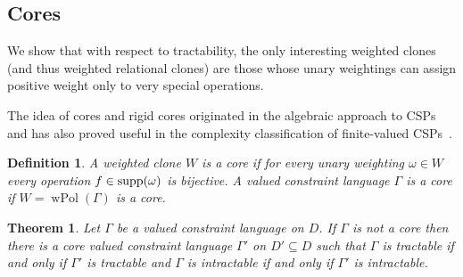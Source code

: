 \documentclass[11pt, reqno]{article}
\DeclareMathOperator{\wpol}{wPol}
\DeclareMathOperator{\supp}{{\rm supp}}
\newtheorem{theorem}{Theorem}%
\newtheorem{definition}{Definition}
\theoremstyle{remark}
\begin{document}
\subsection{Cores}

We show that with respect to tractability, the only
interesting weighted clones (and thus weighted relational clones) are those
whose unary weightings can assign positive weight only to very special
operations.

The idea of cores and rigid cores originated in the algebraic approach to
CSPs~\cite{Jeavons98:algebraic,Bulatov05:classifying} and has also proved useful in the complexity
classification of finite-valued CSPs~\cite{hkp14:sicomp,tz13:stoc}.



\begin{definition}
%
A weighted clone $W$ is a \emph{core} if for every unary weighting $\omega\in W$
every operation $f\in\supp(\omega)$ is bijective.
%
A valued constraint language $\Gamma$ is a core if $W=\wpol(\Gamma)$ is a
core.
\end{definition}

\begin{theorem}\label{thm:squash}
%
Let $\Gamma$ be a valued constraint language on $D$. 
If $\Gamma$ is not a core then there is a core valued constraint language 
$\Gamma'$ on $D'\subseteq D$ such that $\Gamma$ is tractable if and only if
$\Gamma'$ is tractable and $\Gamma$ is intractable if and only if $\Gamma'$ is
intractable.
%
\end{theorem}
\end{document}
